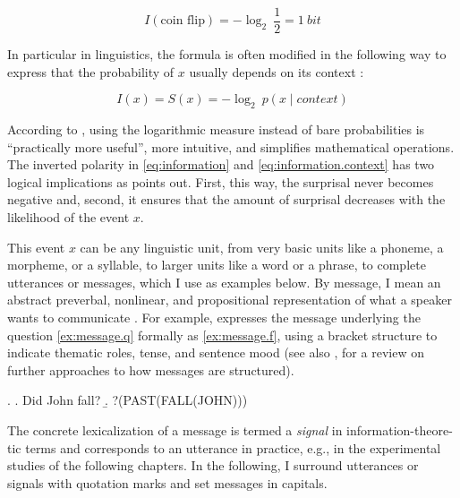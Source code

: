 \begin{equation}
\label{eq:information.coin}
I(\text{coin flip}) = \mathbin{-}\log_{2}\ \frac{1}{2} = 1\ bit
\end{equation}

\noindent
In particular in linguistics, the formula is often modified in the following way to express that the probability of $x$ usually depends on its context \citep[see also][1130]{levy2008}:

\begin{equation}
\label{eq:information.context}
I(x) = S(x) = \mathbin{-}\log_{2}\ p(x\mathbin{|}\textit{context})
\end{equation}

\noindent
According to \citet[379--380]{shannon1948}, using the logarithmic measure instead of bare probabilities is ``practically more useful'', more intuitive, and simplifies mathematical operations. 
The inverted polarity in \eqref{eq:information} and \eqref{eq:information.context} has two logical implications as \citet[156]{lemke2021} points out.
First, this way, the surprisal never becomes negative and, second, it ensures that the amount of surprisal decreases with the likelihood of the event $x$.

This event $x$ can be any linguistic unit, from very basic units like a phoneme, a morpheme, or a syllable, to larger units like a word or a phrase, to complete utterances or messages, which I use as examples below.
By message, I mean an abstract preverbal, nonlinear, and propositional representation of what a speaker wants to communicate \citep[8]{konopka.brown-schmidt2014}.
For example, \citet[101]{levelt1989} expresses the message underlying the question \ref{ex:message.q} formally as \ref{ex:message.f}, using a bracket structure to indicate thematic roles, tense, and sentence mood (see also \cite[9]{konopka.brown-schmidt2014}, for a review on further approaches to how messages are structured).

\ex.
\a.\label{ex:message.q} Did John fall?
\b.\label{ex:message.f} ?(PAST(FALL(JOHN))) \citep[101]{levelt1989}

The concrete lexicalization of a message is termed a \textit{signal} in information-theore- tic terms and corresponds to an utterance in practice, e.g., in the experimental studies of the following chapters.
In the following, I surround utterances or signals with quotation marks and set messages in capitals.

